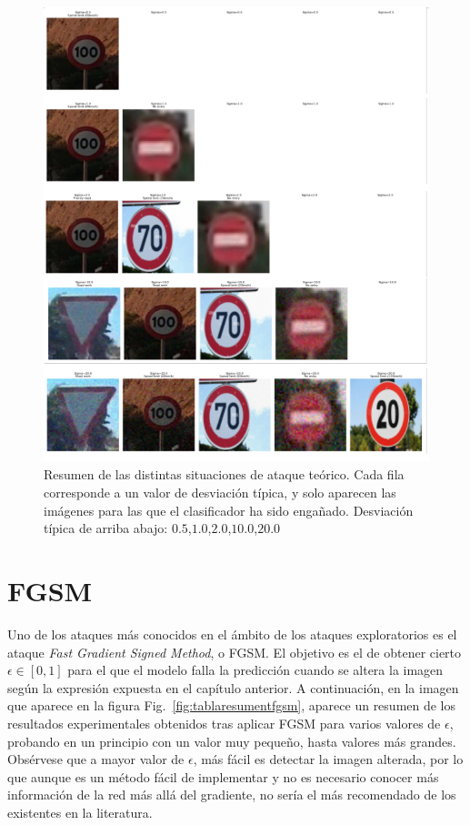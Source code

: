 \begin{figure}[H]
    \centering
        \centering
        \includegraphics[width=\textwidth, height=\textwidth]{img/tabla_resumen_teorico.png}
        \caption{Resumen de las distintas situaciones de ataque teórico. Cada fila corresponde a un valor de desviación típica, y solo aparecen las imágenes para las que el clasificador ha sido engañado. Desviación típica de arriba abajo: $0.5$,$1.0$,$2.0$,$10.0$,$20.0$}
        \label{fig:tablaresumenteorico}
\end{figure}

\section{FGSM}

Uno de los ataques más conocidos en el ámbito de los ataques exploratorios es el ataque \textit{Fast Gradient Signed Method}, o FGSM. El objetivo es el de obtener cierto $\epsilon \in [0,1]$ para el que el modelo falla la predicción cuando se altera la imagen según la expresión expuesta en el capítulo anterior. A continuación, en la imagen que aparece en la figura Fig.~\ref{fig:tablaresumentfgsm}, aparece un resumen de los resultados experimentales obtenidos tras aplicar FGSM para varios valores de $\epsilon$, probando en un principio con un valor muy pequeño, hasta valores más grandes. Obsérvese que a mayor valor de $\epsilon$, más fácil es detectar la imagen alterada, por lo que aunque es un método fácil de implementar y no es necesario conocer más información de la red más allá del gradiente, no sería el más recomendado de los existentes en la literatura.

